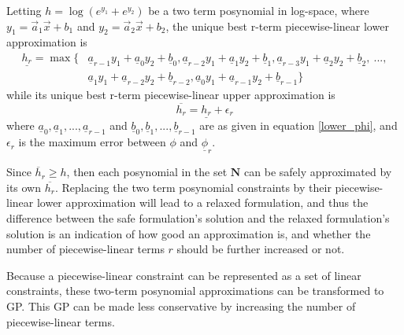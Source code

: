 Letting $h= \log(e^{y_1} + e^{y_2})$ be a two term posynomial in log-space, where $y_1 = \vec{a}_1\vec{x} + b_1$ and $y_2 = \vec{a}_2\vec{x} + b_2$, the unique best r-term piecewise-linear lower approximation is 
\begin{equation}
\begin{aligned}
\underline{h_r} = \max \{&\underline{a}_{r-1}y_1 + \underline{a}_0y_2 + \underline{b}_0, \underline{a}_{r-2}y_1 + \underline{a}_1y_2 + \underline{b}_1, \underline{a}_{r-3}y_1 + \underline{a}_2y_2 + \underline{b}_2,\ ...,\\
 & \underline{a}_{1}y_1 + \underline{a}_{r-2}y_2 + \underline{b}_{r-2}, \underline{a}_0y_1 + \underline{a}_{r-1}y_2 + \underline{b}_{r-1}\}
\end{aligned}
\end{equation}
while its unique best r-term piecewise-linear upper approximation is 
\begin{equation}
\overline{h_r} = \underline{h_r} + \epsilon_r
\end{equation}
where $\underline{a}_{0}, \underline{a}_{1}, ..., \underline{a}_{r-1}$ and $\underline{b}_{0}, \underline{b}_{1}, ..., \underline{b}_{r-1}$ are as given in equation \eqref{lower_phi}, and $\epsilon_r$ is the maximum error between $\phi$ and $\underline{\phi}_r$.

Since $\overline{h}_r \geq h$, then each posynomial in the set $\mathbf{N}$ can be safely approximated by its own $\overline{h_r}$. Replacing the two term posynomial constraints by their piecewise-linear lower approximation will lead to a relaxed formulation, and thus the difference between the safe formulation's solution and the relaxed formulation's solution is an indication of how good an approximation is, and whether the number of piecewise-linear terms $r$ should be further increased or not.

Because a piecewise-linear constraint can be represented as a set of linear constraints, these two-term posynomial approximations can be transformed to GP. This GP can be made less conservative by increasing the number of piecewise-linear terms.